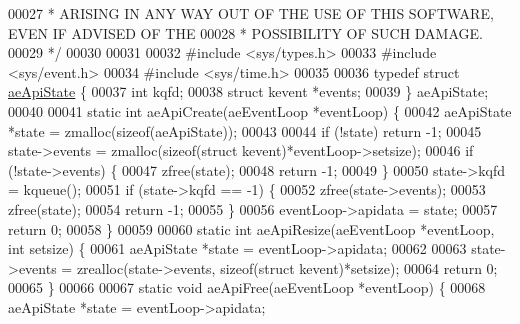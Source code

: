 \begin{DoxyCode}
00027 \textcolor{comment}{ * ARISING IN ANY WAY OUT OF THE USE OF THIS SOFTWARE, EVEN IF ADVISED OF THE}
00028 \textcolor{comment}{ * POSSIBILITY OF SUCH DAMAGE.}
00029 \textcolor{comment}{ */}
00030 
00031 
00032 \textcolor{preprocessor}{#}\textcolor{preprocessor}{include} \textcolor{preprocessor}{<}\textcolor{preprocessor}{sys}\textcolor{preprocessor}{/}\textcolor{preprocessor}{types}\textcolor{preprocessor}{.}\textcolor{preprocessor}{h}\textcolor{preprocessor}{>}
00033 \textcolor{preprocessor}{#}\textcolor{preprocessor}{include} \textcolor{preprocessor}{<}\textcolor{preprocessor}{sys}\textcolor{preprocessor}{/}\textcolor{preprocessor}{event}\textcolor{preprocessor}{.}\textcolor{preprocessor}{h}\textcolor{preprocessor}{>}
00034 \textcolor{preprocessor}{#}\textcolor{preprocessor}{include} \textcolor{preprocessor}{<}\textcolor{preprocessor}{sys}\textcolor{preprocessor}{/}\textcolor{preprocessor}{time}\textcolor{preprocessor}{.}\textcolor{preprocessor}{h}\textcolor{preprocessor}{>}
00035 
00036 \textcolor{keyword}{typedef} \textcolor{keyword}{struct} \hyperlink{structaeApiState}{aeApiState} \{
00037     \textcolor{keywordtype}{int} kqfd;
00038     \textcolor{keyword}{struct} kevent *events;
00039 \} aeApiState;
00040 
00041 \textcolor{keyword}{static} \textcolor{keywordtype}{int} aeApiCreate(aeEventLoop *eventLoop) \{
00042     aeApiState *state = zmalloc(\textcolor{keyword}{sizeof}(aeApiState));
00043 
00044     \textcolor{keywordflow}{if} (!state) \textcolor{keywordflow}{return} -1;
00045     state->events = zmalloc(\textcolor{keyword}{sizeof}(\textcolor{keyword}{struct} kevent)*eventLoop->setsize);
00046     \textcolor{keywordflow}{if} (!state->events) \{
00047         zfree(state);
00048         \textcolor{keywordflow}{return} -1;
00049     \}
00050     state->kqfd = kqueue();
00051     \textcolor{keywordflow}{if} (state->kqfd == -1) \{
00052         zfree(state->events);
00053         zfree(state);
00054         \textcolor{keywordflow}{return} -1;
00055     \}
00056     eventLoop->apidata = state;
00057     \textcolor{keywordflow}{return} 0;
00058 \}
00059 
00060 \textcolor{keyword}{static} \textcolor{keywordtype}{int} aeApiResize(aeEventLoop *eventLoop, \textcolor{keywordtype}{int} setsize) \{
00061     aeApiState *state = eventLoop->apidata;
00062 
00063     state->events = zrealloc(state->events, \textcolor{keyword}{sizeof}(\textcolor{keyword}{struct} kevent)*setsize);
00064     \textcolor{keywordflow}{return} 0;
00065 \}
00066 
00067 \textcolor{keyword}{static} \textcolor{keywordtype}{void} aeApiFree(aeEventLoop *eventLoop) \{
00068     aeApiState *state = eventLoop->apidata;

\end{DoxyCode}
